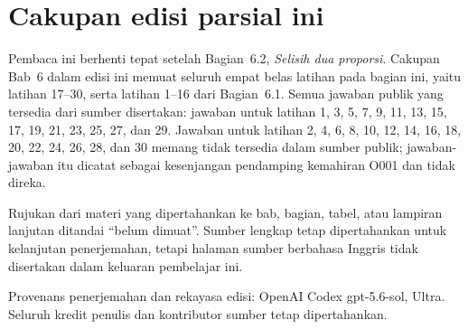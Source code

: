 \documentclass[10pt,openany]%
{book}
\date{}
\begin{document}
%
\renewcommand{\thepage}{}
\maketitle

\renewcommand{\thepage}{\arabic{page}}
\tableofcontents

\normalsize

\chapter*{Cakupan edisi parsial ini}
Pembaca ini berhenti tepat setelah Bagian~6.2,
\emph{Selisih dua proporsi}. Cakupan Bab~6 dalam edisi ini
memuat seluruh empat belas latihan pada bagian ini, yaitu latihan 17--30,
serta latihan 1--16 dari Bagian~6.1. Semua jawaban publik yang tersedia
dari sumber disertakan: jawaban untuk latihan 1, 3, 5, 7, 9, 11, 13, 15,
17, 19, 21, 23, 25, 27, dan 29. Jawaban untuk latihan 2, 4, 6, 8, 10,
12, 14, 16, 18, 20, 22, 24, 26, 28, dan 30 memang tidak tersedia dalam
sumber publik; jawaban-jawaban itu dicatat sebagai kesenjangan pendamping
kemahiran O001 dan tidak direka.

Rujukan dari materi yang dipertahankan ke bab, bagian, tabel, atau lampiran
lanjutan ditandai ``belum dimuat''. Sumber lengkap tetap dipertahankan untuk
kelanjutan penerjemahan, tetapi halaman sumber berbahasa Inggris tidak
disertakan dalam keluaran pembelajar ini.

Provenans penerjemahan dan rekayasa edisi: OpenAI Codex gpt-5.6-sol, Ultra.
Seluruh kredit penulis dan kontributor sumber tetap dipertahankan.

\begingroup
\makeatletter
\def\@currentlabel{belum dimuat}
\label{ch_regr_mult_and_log}
\label{ch_inference_for_means}
\label{oneSampleMeansWithTDistribution}
\label{ch_regr_simple_linear}
\label{appendix_data}
\label{linRegrForTwoVar}
\label{normalProbabilityTable}
\label{multipleAndLogisticRegression}
\makeatother
\endgroup
\end{document}
